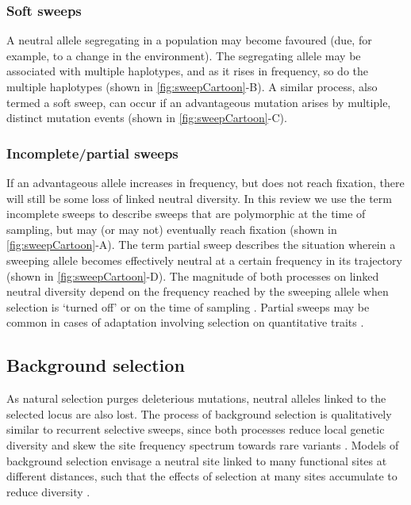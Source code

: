 \subsubsection{Soft sweeps} 
  
A neutral allele segregating in a population may become favoured (due, for example, to a change in the environment). The segregating allele may be associated with multiple haplotypes, and as it rises in frequency, so do the multiple haplotypes (shown in \ref{fig:sweepCartoon}-B). A similar process, also termed a soft sweep, can occur if an advantageous mutation arises by multiple, distinct mutation events (shown in \ref{fig:sweepCartoon}-C). 
 
\subsubsection{Incomplete/partial sweeps} 
 
If an advantageous allele increases in frequency, but does not reach fixation, there will still be some loss of linked neutral diversity. In this review we use the term incomplete sweeps to describe sweeps that are polymorphic at the time of sampling, but may (or may not) eventually reach fixation (shown in \ref{fig:sweepCartoon}-A). The term partial sweep describes the situation wherein a sweeping allele becomes effectively neutral at a certain frequency in its trajectory (shown in \ref{fig:sweepCartoon}-D). The magnitude of both processes on linked neutral diversity depend on the frequency reached by the sweeping allele when selection is ‘turned off’ or on the time of sampling \citep{RN226}. Partial sweeps may be common in cases of adaptation involving selection on quantitative traits \citep{RN147}. 

\subsection{Background selection} 
As natural selection purges deleterious mutations, neutral alleles linked to the selected locus are also lost. The process of background selection is qualitatively similar to recurrent selective sweeps, since both processes reduce local genetic diversity \citep{RN110} and skew the site frequency spectrum towards rare variants \citep{RN287, RN113}. Models of background selection envisage a neutral site linked to many functional sites at different distances, such that the effects of selection at many sites accumulate to reduce diversity \citep{RN206,RN157}. 

